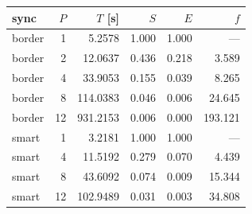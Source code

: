\begin{tabular}{lrrrrr}
\toprule
sync & $P$ & $T$ [s] & $S$ & $E$ & $f$ \\
\midrule
border & 1 & 5.2578 & 1.000 & 1.000 & --- \\
border & 2 & 12.0637 & 0.436 & 0.218 & 3.589 \\
border & 4 & 33.9053 & 0.155 & 0.039 & 8.265 \\
border & 8 & 114.0383 & 0.046 & 0.006 & 24.645 \\
border & 12 & 931.2153 & 0.006 & 0.000 & 193.121 \\
smart & 1 & 3.2181 & 1.000 & 1.000 & --- \\
smart & 4 & 11.5192 & 0.279 & 0.070 & 4.439 \\
smart & 8 & 43.6092 & 0.074 & 0.009 & 15.344 \\
smart & 12 & 102.9489 & 0.031 & 0.003 & 34.808 \\
\bottomrule
\end{tabular}
